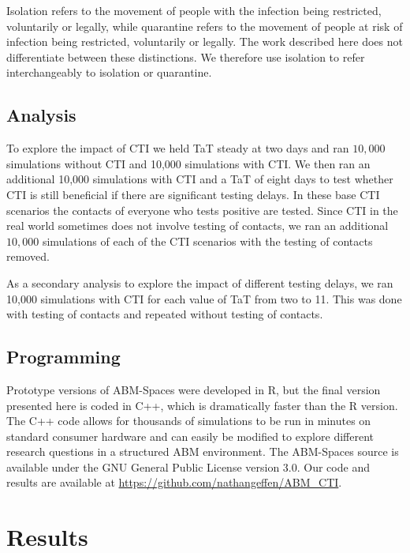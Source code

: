 \documentclass{article}
\begin{document}
\begin{description}
  Isolation refers to the movement of people with the infection being
  restricted, voluntarily or legally, while quarantine refers to the movement of
  people at risk of infection being restricted, voluntarily or legally. The work
  described here does not differentiate between these distinctions. We therefore
  use isolation to refer interchangeably to isolation or quarantine.

\end{description}

\subsection{Analysis}

To explore the impact of CTI we held TaT steady at two days and ran $10,000$
simulations without CTI and 10,000 simulations with CTI. We then ran an
additional 10,000 simulations with CTI and a TaT of eight days to test whether
CTI is still beneficial if there are significant testing delays. In these base
CTI scenarios the contacts of everyone who tests positive are tested. Since CTI
in the real world sometimes does not involve testing of contacts, we ran an
additional $10,000$ simulations of each of the CTI scenarios with the testing of
contacts removed.

As a secondary analysis to explore the impact of different testing delays, we
ran 10,000 simulations with CTI for each value of TaT from two to 11. This was
done with testing of contacts and repeated without testing of contacts.

\subsection{Programming}

Prototype versions of ABM-Spaces were developed in R, but the final version
presented here is coded in C++, which is dramatically faster than the R
version. The C++ code allows for thousands of simulations to be run in minutes
on standard consumer hardware and can easily be modified to explore different
research questions in a structured ABM environment. The ABM-Spaces source is
available under the GNU General Public License version 3.0. Our code and results
are available at \url{https://github.com/nathangeffen/ABM_CTI}.

\section{Results}\label{results}
\end{document}
